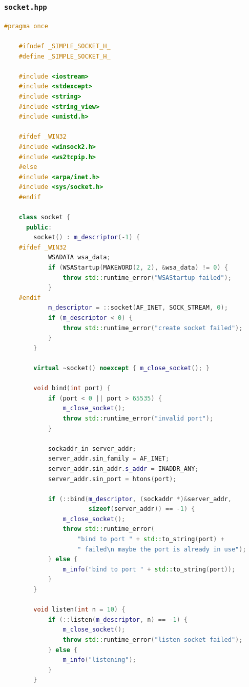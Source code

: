 \documentclass{article}
\begin{document}
\subsubsection{\texttt{socket.hpp}}

\begin{lstlisting}[language=C++]
    #pragma once

    #ifndef _SIMPLE_SOCKET_H_
    #define _SIMPLE_SOCKET_H_
    
    #include <iostream>
    #include <stdexcept>
    #include <string>
    #include <string_view>
    #include <unistd.h>
    
    #ifdef _WIN32
    #include <winsock2.h>
    #include <ws2tcpip.h>
    #else
    #include <arpa/inet.h>
    #include <sys/socket.h>
    #endif
    
    class socket {
      public:
        socket() : m_descriptor(-1) {
    #ifdef _WIN32
            WSADATA wsa_data;
            if (WSAStartup(MAKEWORD(2, 2), &wsa_data) != 0) {
                throw std::runtime_error("WSAStartup failed");
            }
    #endif
            m_descriptor = ::socket(AF_INET, SOCK_STREAM, 0);
            if (m_descriptor < 0) {
                throw std::runtime_error("create socket failed");
            }
        }
    
        virtual ~socket() noexcept { m_close_socket(); }
    
        void bind(int port) {
            if (port < 0 || port > 65535) {
                m_close_socket();
                throw std::runtime_error("invalid port");
            }
    
            sockaddr_in server_addr;
            server_addr.sin_family = AF_INET;
            server_addr.sin_addr.s_addr = INADDR_ANY;
            server_addr.sin_port = htons(port);
    
            if (::bind(m_descriptor, (sockaddr *)&server_addr,
                       sizeof(server_addr)) == -1) {
                m_close_socket();
                throw std::runtime_error(
                    "bind to port " + std::to_string(port) +
                    " failed\n maybe the port is already in use");
            } else {
                m_info("bind to port " + std::to_string(port));
            }
        }
    
        void listen(int n = 10) {
            if (::listen(m_descriptor, n) == -1) {
                m_close_socket();
                throw std::runtime_error("listen socket failed");
            } else {
                m_info("listening");
            }
        }
    

\end{lstlisting}
\end{document}

